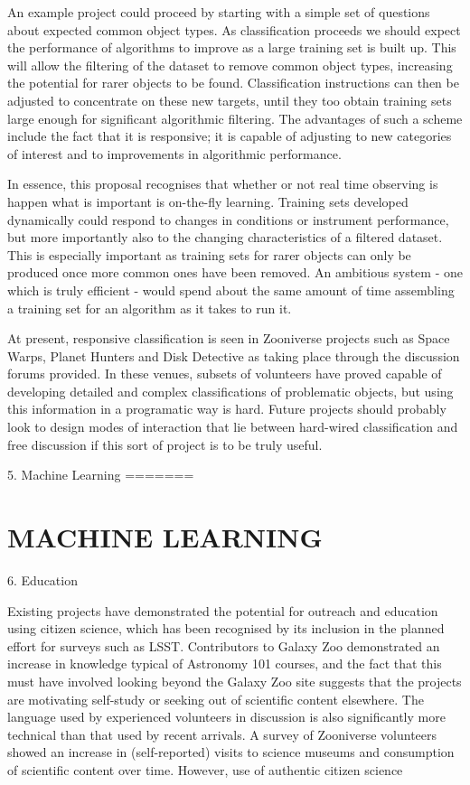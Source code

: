 \documentclass{pasa}
\begin{document}
An example project could proceed by starting with a simple set of questions about expected common object types. As classification proceeds we should expect the performance of algorithms to improve as a large training set is built up. This will allow the filtering of the dataset to remove common object types, increasing the potential for rarer objects to be found. Classification instructions can then be adjusted to concentrate on these new targets, until they too obtain training sets large enough for significant algorithmic filtering. The advantages of such a scheme include the fact that it is responsive; it is capable of adjusting to new categories of interest and to improvements in algorithmic performance. 

In essence, this proposal recognises that whether or not real time observing is happen what is important is on-the-fly learning. Training sets developed dynamically could respond to changes in conditions or instrument performance, but more importantly also to the changing characteristics of a filtered dataset. This is especially important as training sets for rarer objects can only be produced once more common ones have been removed. An ambitious system - one which is truly efficient - would spend about the same amount of time assembling a training set for an algorithm as it takes to run it. 

At present, responsive classification is seen in Zooniverse projects such as Space Warps, Planet Hunters and Disk Detective as taking place through the discussion forums provided. In these venues, subsets of volunteers have proved capable of developing detailed and complex classifications of problematic objects, but using this information in a programatic way is hard. Future projects should probably look to design modes of interaction that lie between hard-wired classification and free discussion if this sort of project is to be truly useful. 


5. Machine Learning
=======
\section{MACHINE LEARNING}
\label{sec:ml}

6. Education

Existing projects have demonstrated the potential for outreach and education using citizen science, which has been recognised by its inclusion in the planned effort for surveys such as LSST. Contributors to Galaxy Zoo demonstrated an increase in knowledge typical of Astronomy 101 courses, and the fact that this must have involved looking beyond the Galaxy Zoo site suggests that the projects are motivating self-study or seeking out of scientific content elsewhere. The language used by experienced volunteers in discussion is also significantly more technical than that used by recent arrivals. A survey of Zooniverse volunteers showed an increase in (self-reported) visits to science museums and consumption of scientific content over time. However, use of authentic citizen science 
\end{document}
